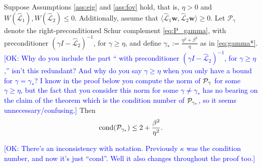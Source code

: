 \documentclass[review]{siamart}
\newcommand{\OK}[1]{\textcolor{blue}{[OK: #1]}}
\begin{document}
%
\begin{theorem}\label{th:cond}
Suppose Assumptions \ref{ass:eig} and \ref{ass:fov} hold, that is, $\eta > 0$
and $W(\widehat{\mathcal{L}}_1),W(\widehat{\mathcal{L}}_2) \leq 0$.
Additionally, assume that $\langle\widehat{\mathcal{L}}_1\mathbf{w},
\widehat{\mathcal{L}}_2\mathbf{w}\rangle\geq 0$. Let $\mathcal{P}_\gamma$
denote the right-preconditioned Schur complement \eqref{eq:P_gamma}, with
preconditioner $(\gamma I - \widehat{\mathcal{L}}_2)^{-1}$, for $\gamma \geq\eta$,
and define $\gamma_* := \tfrac{\eta^2+\beta^2}{\eta}$ as in \eqref{eq:gamma*}.
%
\OK{Why do you include the part ``
with preconditioner $(\gamma I - \widehat{\mathcal{L}}_2)^{-1}$, for $\gamma \geq\eta$,'' isn't this redundant? And why do you say $\gamma \geq \eta$ when you only have a bound for $\gamma = \gamma_*$? I know in the proof below you compute the norm of ${\cal P}_{\gamma}$ for some $\gamma \geq \eta$, but the fact that you consider this norm for some $\gamma \neq \gamma_*$ has no bearing on the claim of the theorem which is the condition number of ${\cal P}_{\gamma_*}$, so it seems unnecessary/confusing.}
%
Then
\begin{align}\label{eq:gammastar_cond}
\textnormal{cond}(\mathcal{P}_{\gamma_*}) \leq
	2 + \frac{\beta^2}{\eta^2}.
\end{align}
\end{theorem}
\OK{There's an inconsistency with notation. Previously $\kappa$ was the condition  number, and now it's just ``cond''.  Well it also changes throughout the proof too.}
\end{document}
